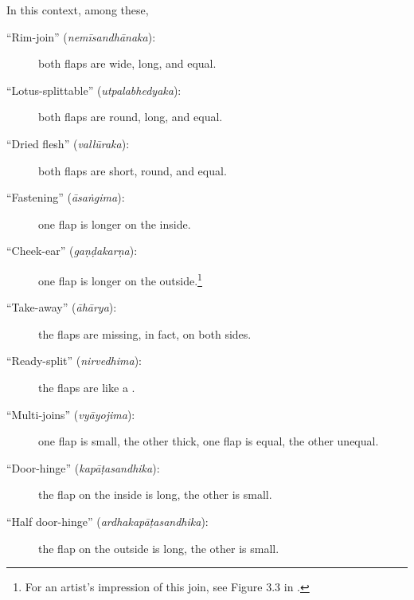 \begin{translation}
    In this context, among these, 
    \begin{description}
        
        \item[\mdseries``Rim-join'' (\emph{nemīsandhānaka}):]
        both flaps are wide, long, and equal.
        
        \item[\mdseries``Lotus-splittable'' (\emph{utpalabhedyaka}):]
        both flaps are round, long, and equal.
        
        \item[\mdseries``Dried flesh'' (\emph{vallūraka}):]
        both flaps are short, round, and equal.
        
        \item[\mdseries``Fastening'' (\emph{āsaṅgima}):]
        one flap is longer on the inside.
        
        \item[\mdseries``Cheek-ear'' (\emph{gaṇḍakarṇa}):]
        one flap is longer on the outside.\footnote{For an artist's impression of this join, see Figure 3.3 in \cites[155]{wuja-2003}.}
        
        \item[\mdseries``Take-away'' (\emph{āhārya}):]
        the flaps are missing, in fact, on both sides.
        
        \item[\mdseries``Ready-split'' (\emph{nirvedhima}):]
        the flaps are like a .
        
        \item[\mdseries``Multi-joins'' (\emph{vyāyojima}):]
        one flap is small, the other thick, one flap is equal, the other unequal.
        
        \item[\mdseries``Door-hinge'' (\emph{kapāṭasandhika}):]
        the flap on the inside is long, the other is small.
        
        \item[\mdseries``Half door-hinge'' (\emph{ardhakapāṭasandhika}):]
        the flap on the outside is long, the other is small.
    \end{description}


\end{translation}
